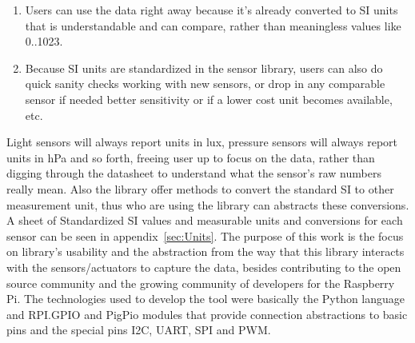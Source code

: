 \documentclass{acm_proc_article-sp}
\begin{document}
\begin{enumerate}
\item Users can use the data right away because it's already converted to SI units that is understandable and can compare, rather than meaningless values like 0..1023.
\item Because SI units are standardized in the sensor library, users can also do quick sanity checks working with new sensors, or drop in any comparable sensor if needed better sensitivity or if a lower cost unit becomes available, etc.
\end{enumerate}

Light sensors will always report units in lux, pressure sensors will always report units in hPa and so forth, freeing user up to focus on the data, rather than digging through the datasheet to understand what the sensor's raw numbers really mean. Also the library offer methods to convert the standard SI to other measurement unit, thus who are using the library can abstracts these conversions. A sheet of Standardized SI values and measurable units and conversions for each sensor can be seen in appendix~\ref{sec:Units}.
\newline
\newline
The purpose of this work is the focus on library's usability and the abstraction from the way that this library interacts with the sensors/actuators to capture the data, besides contributing to the open source community and the growing community of developers for the Raspberry Pi.
\newline
\newline
The technologies used to develop the tool were basically the Python language and RPI.GPIO and PigPio modules that provide connection abstractions to basic pins and the special pins I2C, UART, SPI and PWM.
\end{document}
